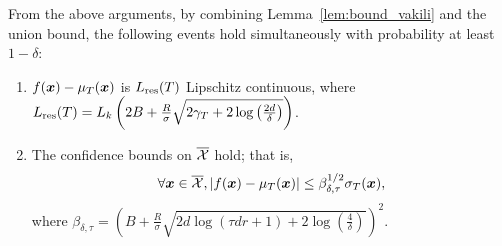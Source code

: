

From the above arguments, by combining Lemma~\ref{lem:bound_vakili} and the union bound, the following events hold simultaneously with probability at least $1 - \delta$:
\begin{enumerate}
    \item $f(\boldsymbol{x}) - \mu_T(\boldsymbol{x})$ is $L_{\rm res}(T)$ Lipschitz continuous, where $L_{\rm res}(T) = L_k \left( 2B + \frac{R}{\sigma} \sqrt{ 2\gamma_T + 2 \log \left( \frac{2d}{\delta} \right)} \right)$.
    \item The confidence bounds on $\overline{{\cal X}}$ hold; that is, 
    \begin{align*}
        \forall \boldsymbol{x} \in \overline{{\cal X}}, |f(\boldsymbol{x}) - \mu_T(\boldsymbol{x})| \leq \beta_{\delta, \tau}^{1/2} \sigma_T (\boldsymbol{x}),
    \end{align*}
    where $\beta_{\delta, \tau} = \left( B + \frac{R}{\sigma} \sqrt{ 2 d \log \left( \tau d r + 1 \right) + 2 \log \left( \frac{4}{\delta} \right)} \right)^2$.
\end{enumerate}



